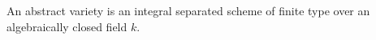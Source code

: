 An abstract variety is an integral separated scheme of finite type over an algebraically closed field $k$.
